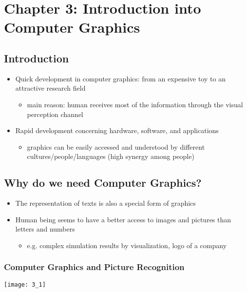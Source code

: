 \documentclass{standalone}
\begin{document}
\section{Chapter 3: Introduction into Computer Graphics}

\subsection{Introduction}

\begin{itemize}
	\item Quick development in computer graphics: from an expensive toy to an attractive research field
		\begin{itemize}
			\item main reason: human receives most of the information through the visual perception channel
			\end{itemize}
	\item Rapid development concerning hardware, software, and applications
		\begin{itemize}
			\item graphics can be easily accessed and understood by different cultures/people/languages (high synergy among people)
		\end{itemize}
\end{itemize}

\subsection{Why do we need Computer Graphics?}

\begin{itemize}
	\item The representation of texts is also a special form of graphics
	\item Human being seems to have a better access to images and pictures than letters and numbers
		\begin{itemize}
			\item e.g. complex simulation results by visualization, logo of a company
		\end{itemize}
\end{itemize}

\subsubsection*{Computer Graphics and Picture Recognition}

\texttt{[image: 3\_1]}
\end{document}
